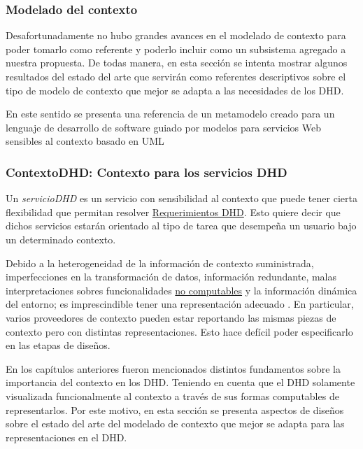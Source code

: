 

\subsubsection {Modelado del contexto} \label{sec:contextodhd}

Desafortunadamente no hubo grandes avances en el modelado de contexto 
para poder tomarlo como referente y poderlo incluir como un subsistema agregado
a nuestra propuesta. De todas manera, en esta sección se intenta mostrar
algunos resultados del estado del arte que servirán como referentes
descriptivos sobre el tipo de modelo de contexto que mejor se adapta a las
necesidades de los DHD.

En este  sentido se presenta una referencia de un metamodelo creado para un
lenguaje de desarrollo de software guiado por modelos para servicios Web
sensibles al contexto basado en UML \cite{ContextUML} 

\subsubsection{ContextoDHD: Contexto para los servicios DHD} \label{contextodhd}

Un \textit{servicioDHD} \label{serviciodhd} es un servicio con sensibilidad al
contexto que puede tener cierta flexibilidad que permitan resolver 
\hyperref[RequerimientosDHD]{Requerimientos DHD}. Esto quiere decir que dichos
servicios estarán orientado al tipo de tarea que desempeña un usuario bajo
un determinado contexto. 


Debido a la heterogeneidad de la información de contexto suministrada,
imperfecciones en la transformación de datos, información redundante, malas
interpretaciones sobres funcionalidades \hyperref[no_computable]{no
computables} y la información dinámica del entorno; es imprescindible tener
una representación adecuado \cite{contextToolKit}. En particular, varios
proveedores de contexto pueden estar reportando las mismas piezas de contexto
pero con distintas representaciones. Esto hace defícil poder especificarlo en
las etapas de diseños. 

En los capítulos anteriores fueron mencionados distintos fundamentos sobre la
importancia del contexto en los DHD. Teniendo en cuenta que el DHD solamente
visualizada funcionalmente al contexto a través de sus formas computables de
representarlos. Por este motivo, en esta sección se presenta aspectos de
diseños sobre el estado del arte del modelado de contexto que mejor se adapta
para las representaciones en el DHD. 


